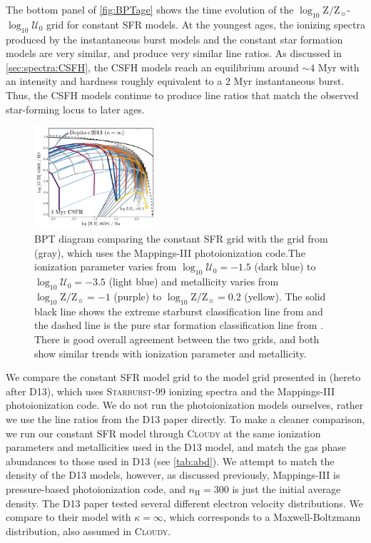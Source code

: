 \documentclass[trackchanges, twocolumn, tighten]{aastex61}
\newcommand{\Fig}[1]{\autoref{fig:#1}}
\newcommand{\Sec}[1]{\autoref{sec:#1}}
\newcommand{\Tab}[1]{\autoref{tab:#1}}
\newcommand{\Mappings}{{\sc Mappings-III}\xspace}
\newcommand{\SB}{\textsc{Starburst-99}\xspace}
\newcommand{\Cloudy}{\textsc{Cloudy}\xspace}
\newcommand{\logten}{\ensuremath{\log_{10}}}
\newcommand{\nH}{\ensuremath{n_{\mathrm{H}}}}
\newcommand{\logz}{\ensuremath{\logten \mathrm{Z}/\mathrm{Z}_{\sun}}}
\newcommand{\logZeq}[1]{\ensuremath{\logten \mathrm{Z}/\mathrm{Z}_{\sun} = #1}}
\newcommand{\logU}{\ensuremath{\logten \mathcal{U}_0}}
\begin{document}
The bottom panel of \Fig{BPTage} shows the time evolution of the \logz{}-\logU{} grid for constant SFR models. At the youngest ages, the ionizing spectra produced by the instantaneous burst models and the constant star formation models are very similar, and produce very similar line ratios. As discussed in \Sec{spectra:CSFH}, the CSFH models reach an equilibrium around $\sim4$ Myr with an intensity and hardness roughly equivalent to a 2 Myr instantaneous burst. Thus, the CSFH models continue to produce line ratios that match the observed star-forming locus to later ages.
\begin{figure} [h!]
  \begin{centering}
    \includegraphics[width=0.4\textwidth]{f17.pdf}
    \caption{BPT diagram comparing the constant SFR grid with the grid from \citet{Dopita13} (gray), which uses the \Mappings photoionization code.The ionization parameter varies from $\logU=-1.5$ (dark blue) to $\logU=-3.5$ (light blue) and metallicity varies from \logZeq{-1} (purple) to \logZeq{0.2} (yellow). The solid black line shows the extreme starburst classification line from \citet{Kewley01} and the dashed line is the pure star formation classification line from \citet{Kauffmann03a}. There is good overall agreement between the two grids, and both show similar trends with ionization parameter and metallicity.}
    \label{fig:CSFHdop}
  \end{centering}
\end{figure}

We compare the constant SFR model grid to the model grid presented in \citet{Dopita13} (hereto after D13), which uses \SB{} ionizing spectra and the \Mappings photoionization code. We do not run the photoionization models ourselves, rather we use the line ratios from the D13 paper directly. To make a cleaner comparison, we run our constant SFR model through \Cloudy at the same ionization parameters and metallicities used in the D13 model, and match the gas phase abundances to those used in D13 (see \Tab{abd}). We attempt to match the density of the D13 models, however, as discussed previously, \Mappings is pressure-based photoionization code, and $\nH=300$ is just the initial average density. The D13 paper tested several different electron velocity distributions. We compare to their model with $\kappa=\infty$, which corresponds to a Maxwell-Boltzmann distribution, also assumed in \Cloudy.
\end{document}
